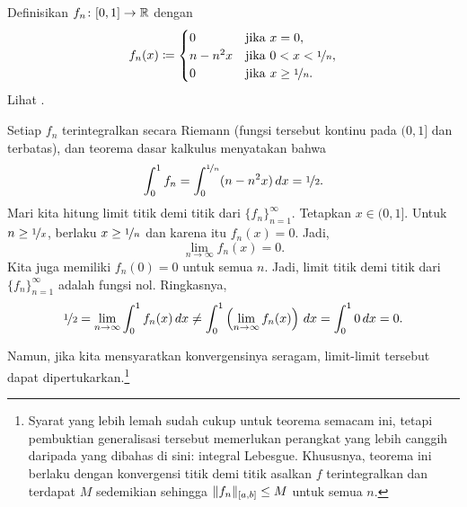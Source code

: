 \begin{example}
Definisikan $f_n \colon [0,1] \to {\mathbb{R}}$ dengan
\begin{equation*}
f_n(x) \coloneqq
\begin{cases}
0 &  \text{jika } x = 0,\\
n-n^2x &  \text{jika } 0 < x < \nicefrac{1}{n},\\
0 &  \text{jika } x \geq \nicefrac{1}{n}.
\end{cases}
\avoidbreak
\end{equation*}
Lihat .

\begin{myfigureht}
\caption{Grafik $f_n(x)$.%
\label{intconvcntr:fig}}
\end{myfigureht}

Setiap $f_n$ terintegralkan secara Riemann (fungsi tersebut kontinu pada $(0,1]$ dan terbatas),
dan teorema dasar kalkulus menyatakan bahwa
\begin{equation*}
\int_0^1 f_n =
\int_0^{\nicefrac{1}{n}} (n-n^2x)\,dx = \nicefrac{1}{2} .
\end{equation*}
Mari kita hitung limit titik demi titik dari $\{ f_n \}_{n=1}^\infty$.
Tetapkan $x \in (0,1]$.  Untuk $n \geq \nicefrac{1}{x}$,
berlaku $x \geq \nicefrac{1}{n}$ dan karena itu $f_n(x) = 0$.  Jadi,
\begin{equation*}
\lim_{n \to \infty} f_n(x) = 0.
\end{equation*}
Kita juga memiliki $f_n(0) = 0$ untuk semua $n$.  Jadi, limit titik demi titik
dari $\{ f_n \}_{n=1}^\infty$ adalah fungsi nol.
Ringkasnya,
\begin{equation*}
\nicefrac{1}{2} =
\lim_{n\to\infty}
\int_0^1 f_n (x)\,dx
\neq
\int_0^1
\left(
\lim_{n\to\infty}
f_n(x)\right)\,dx
=
\int_0^1 0\,dx = 0 .
\end{equation*}
\end{example}

Namun, jika kita mensyaratkan konvergensinya seragam, limit-limit tersebut dapat
dipertukarkan.\footnote{Syarat yang lebih lemah
sudah cukup untuk teorema semacam ini, tetapi pembuktian generalisasi tersebut memerlukan
perangkat yang lebih canggih daripada yang dibahas di sini: integral Lebesgue.
Khususnya, teorema ini berlaku dengan konvergensi titik demi titik
asalkan $f$ terintegralkan dan terdapat $M$ sedemikian sehingga
$\lVert {f_n} \rVert_{[a,b]} \leq M$ untuk semua $n$.}

